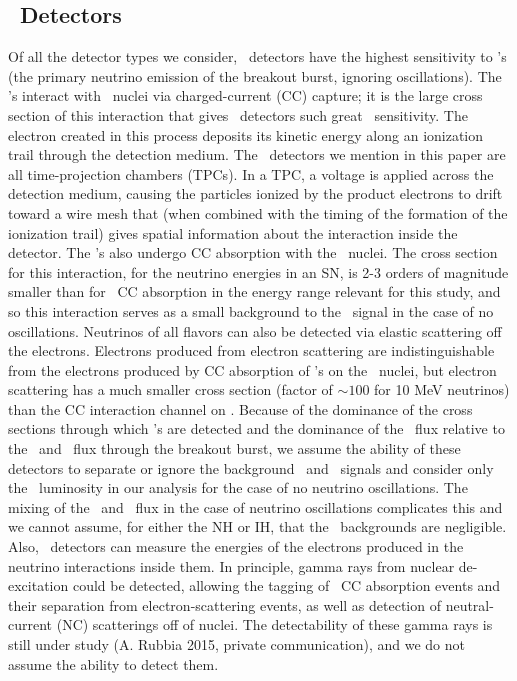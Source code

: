 \subsection{\ Detectors}
Of all the detector types we consider, 
\ detectors have the highest sensitivity to \nue's (the primary
neutrino emission of the breakout burst, ignoring oscillations). The 
\nue's interact
with \ nuclei via charged-current (CC) 
capture; it is the large cross section of
this interaction  that gives \ 
detectors such great \nue\ sensitivity.  The electron created in this
process deposits its kinetic energy 
along an ionization trail through the detection medium.  The \
detectors we mention  in this paper are all time-projection chambers
(TPCs).  In a TPC, a voltage is applied
across the detection medium, causing the particles ionized by the
product electrons to drift
toward a wire mesh that (when combined with the timing of the
formation of the ionization trail) gives spatial information about the
interaction inside the detector.  The \anue's also undergo CC
absorption with the \ar40\ nuclei.  The cross section for this
interaction, for the neutrino energies in an SN, is 2-3
orders of magnitude smaller than for \nue\ CC absorption
in the energy range relevant for this study,
and so this interaction serves as a small background to the \nue\
signal in the case of no oscillations.  Neutrinos of all flavors can also be
detected  via elastic scattering off the electrons.
Electrons produced from electron scattering are 
indistinguishable from the electrons produced by CC
absorption of \nue's on the \ nuclei, but electron scattering has a
much smaller cross section (factor of ${\sim}100$ for 10 MeV neutrinos) 
than the CC interaction channel on \ar40.
 Because of the dominance of
the cross sections through which \nue's are detected and the dominance
of the \nue\ flux relative to the \anue\ and \nux\ flux through the breakout
burst, we assume the ability of these detectors to separate or ignore
the background \anue\ and \nux\ signals 
and consider only the \nue\ luminosity in our analysis for the case of
no neutrino oscillations.  The mixing of the \nuxpart\ and \nue\ flux
in the case of neutrino oscillations complicates this and we cannot
assume, for either the NH or IH, that the \nuxpart\ backgrounds are negligible. 
Also, \ar40\ detectors can measure
the energies of the electrons produced in the neutrino interactions
inside them.  
In principle, gamma rays from nuclear de-excitation
could be detected, allowing the tagging of \nue\ CC
absorption events and their separation from electron-scattering
events, as well as detection of neutral-current (NC) scatterings off of
nuclei.  The detectability of these gamma rays is still under study
(A. Rubbia 2015, private communication),
and we do not assume the ability to detect them.

